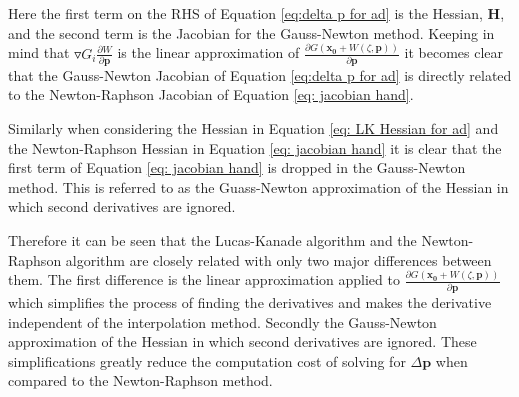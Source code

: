 \documentclass[12pt,oneside,openany,a4paper, %
english, %
masters-t, goldenblock]{usthesis}
\newcommand*\mean[1]{\bar{#1}} %
\begin{document}

Here the first term on the RHS of Equation \ref{eq:delta p for ad} is the Hessian, $\bm{H}$, and the second term is the Jacobian for the Gauss-Newton method. Keeping in mind that $\triangledown G_i \frac{\partial W}{\partial \bm{p}}$ is the linear approximation of $\frac{\partial G(\bm{x_0} + W(\zeta, \bm{p}))}{\partial \bm{p}}$ it becomes clear that the Gauss-Newton Jacobian of Equation \ref{eq:delta p for ad} is directly related to the Newton-Raphson Jacobian of Equation \ref{eq: jacobian hand}.

Similarly when considering the Hessian in Equation \ref{eq: LK Hessian for ad} and the Newton-Raphson Hessian in Equation \ref{eq: jacobian hand} it is clear that the first term of Equation \ref{eq: jacobian hand} is dropped in the Gauss-Newton method. This is referred to as the Guass-Newton approximation of the Hessian in which second derivatives are ignored.

Therefore it can be seen that the Lucas-Kanade algorithm and the Newton-Raphson algorithm are closely related with only two major differences between them. The first difference is the linear approximation applied to $\frac{\partial G(\bm{x_0} + W(\zeta, \bm{p}))}{\partial \bm{p}}$ which simplifies the process of finding the derivatives and makes the derivative independent of the interpolation method. Secondly the Gauss-Newton approximation of the Hessian in which second derivatives are ignored. These simplifications greatly reduce the computation cost of solving for $\Delta \bm{p}$ when compared to the Newton-Raphson method.
\end{document}
